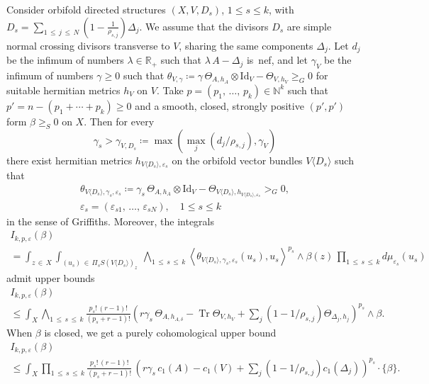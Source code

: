 \documentclass[AHL,Unicode,longabstracts,published]{cedram}
\DeclareMathOperator{\Tr}{Tr}
\newcommand*\Id{\mathrm{Id}}
\newcommand*\bN{\mathbb{N}}
\newcommand*\bR{\mathbb{R}}
\let\leq\leqslant
\let\geq\geqslant
\newcommand*\bydef{\coloneqq}
\begin{document}
\begin{prop}\label{6.20}
Consider orbifold directed structures
$(X,V,D_s)$, $1\leq s\leq k$, with
$D_s=\sum_{1\,\leq\,j\,\leq\,N}(1-\tfrac{1}{\rho_{s,j}})\Delta_j$. We assume that the divisors $D_s$ are simple normal crossing divisors transverse to $V$, sharing the same components $\Delta_j$. Let $d_j$ be the infimum of numbers
$\lambda\in\bR_+$ such that $\lambda\,A-\Delta_j$ is~nef, and let
$\gamma_V$ be the infimum of numbers
$\gamma\geq 0$ such that
$\theta_{V,\gamma}\bydef\gamma\,\Theta_{A,h_A}\otimes\Id_V-\Theta_{V,h_V}\geq_G0$ for suitable hermitian metrics $h_V$ on $V$. Take $p=(p_1,\,\dotsc,\,p_k)\in\bN^k$ such that $p'=n-(p_1+\dotsb+p_k)\geq 0$ and a smooth, closed, strongly positive $(p',p')$ form $\beta\geq_S0$ on $X$. Then for every
\[
\gamma_s>\gamma_{V,D_s}\bydef\max\left(\max_j(d_j/\rho_{s,j}),\gamma_V\right)
\]
there exist hermitian metrics
$h_{V\langle D_s\rangle,\varepsilon_s}$ on the orbifold vector bundles
$V\langle D_s\rangle$ such that
\begin{multline*}
\theta_{V\langle D_s\rangle,\gamma_s,\varepsilon_s}\bydef\gamma_s
\,\Theta_{A,h_A}\otimes\Id_V-\Theta_{V\langle D_s\rangle, h_{V\langle D_s\rangle,\varepsilon_s}}>_G0,\\
\varepsilon_s=(\varepsilon_{s1},\,\dotsc,\,\varepsilon_{sN}),\quad 1\leq s\leq k
\end{multline*}
in the sense of Griffiths. Moreover, the integrals
\begin{multline}
\tag{a} I_{k,p,\varepsilon}(\beta)\\
=
\int_{z\,\in\,X}\int_{(u_s)\,\in\,\Pi_s S(V\langle D_s\rangle)_z}~\bigwedge_{1\,\leq\,s\,\leq\,k}
\left\langle\theta_{V\langle D_s\rangle,\gamma_s,\varepsilon_s}(u_s),u_s\right\rangle^{p_s}
\wedge\beta(z)\,\prod_{1\,\leq\,s\,\leq\,k}d\mu_{\varepsilon_s}(u_s)
\end{multline}
admit upper bounds
\begin{multline}
\tag{b} I_{k,p,\varepsilon}(\beta)\\
\le
\int_X\bigwedge_{1\,\leq\,s\,\leq\,k}\tfrac{p_s!\,(r-1)!}{(p_s+r-1)!}
\left(r\gamma_s\,\Theta_{A,h_{A,\delta}}-\Tr\Theta_{V,h_V}+
\sum_j(1-1/\rho_{s,j})\Theta_{\Delta_j,h_j}\right)^{p_s}\!\wedge\beta.
\end{multline}
When $\beta$ is closed, we get a purely cohomological upper bound
\begin{multline}
\tag{c} I_{k,p,\varepsilon}(\beta)\\
\le
\int_X\prod_{1\,\leq\,s\,\leq\,k}\tfrac{p_s!\,(r-1)!}{(p_s+r-1)!}\,
\left(r\gamma_s\,c_1(A)-c_1(V)+\sum_j(1-1/\rho_{s,j})c_1(\Delta_j)\right)^{p_s}
\cdot\{\beta\}.
\end{multline}
\end{prop}
\end{document}

